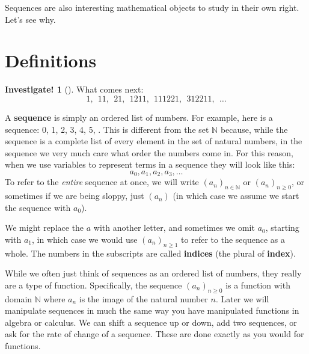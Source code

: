 \documentclass[12pt,]{book}
\newcommand{\terminology}[1]{\textbf{#1}}
\theoremstyle{plain}
\theoremstyle{definition}
\theoremstyle{definition}
\theoremstyle{definition}
\newtheorem{investigation}[project]{Investigate!}
\numberwithin{equation}{chapter}
\newcommand{\N}{\mathbb N}
\begin{document}
\par
\hypertarget{p-21}{}%
Sequences are also interesting mathematical objects to study in their own right. Let's see why.%
\typeout{************************************************}
\typeout{************************************************}
\section[{Definitions}]{Definitions}\label{sec_seq_intro}
\begin{investigation}[]\label{investigation-2}
\hypertarget{p-22}{}%
What comes next:%
\begin{equation*}
1, ~~11, ~~21, ~~1211, ~~111221, ~~312211, ~~\ldots
\end{equation*}
%
\end{investigation}
\hypertarget{p-23}{}%
A \terminology{sequence} is simply an ordered list of numbers. For example, here is a sequence: 0, 1, 2, 3, 4, 5, \textellipsis{}. This is different from the set \(\N\) because, while the sequence is a complete list of every element in the set of natural numbers, in the sequence we very much care what order the numbers come in. For this reason, when we use variables to represent terms in a sequence they will look like this:%
\begin{equation*}
a_0, a_1, a_2, a_3, \ldots
\end{equation*}
To refer to the \emph{entire} sequence at once, we will write \((a_n)_{n\in\N}\) or \((a_n)_{n\ge 0}\), or sometimes if we are being sloppy, just \((a_n)\) (in which case we assume we start the sequence with \(a_0\)). \label{notation-1}
%
\par
\hypertarget{p-24}{}%
We might replace the \(a\) with another letter, and sometimes we omit \(a_0\), starting with \(a_1\), in which case we would use \((a_n)_{n \ge 1}\) to refer to the sequence as a whole. The numbers in the subscripts are called \terminology{indices} (the plural of \terminology{index}).%
\par
\hypertarget{p-25}{}%
While we often just think of sequences as an ordered list of numbers, they really are a type of function. Specifically, the sequence \((a_n)_{n\ge 0}\) is a function with domain \(\N\) where \(a_n\) is the image of the natural number \(n\). Later we will manipulate sequences in much the same way you have manipulated functions in algebra or calculus. We can shift a sequence up or down, add two sequences, or ask for the rate of change of a sequence. These are done exactly as you would for functions.%
\end{document}
